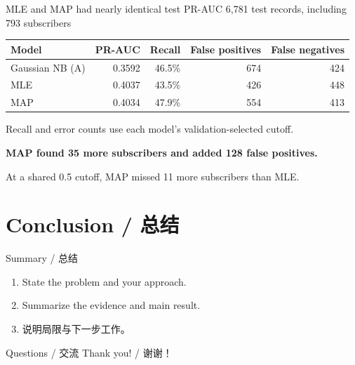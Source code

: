 \documentclass[10pt,aspectratio=169]{beamer}
\begin{document}
\begin{frame}{MLE and MAP had nearly identical test PR-AUC}
  \centering
  \small 6,781 test records, including 793 subscribers\par
  \medskip
  \normalsize
  \renewcommand{\arraystretch}{1.4}
  \begin{tabular*}{0.95\textwidth}{@{\extracolsep{\fill}}lrrrr@{}}
    \hline
    \textbf{Model} & \textbf{PR-AUC} & \textbf{Recall} &
      \textbf{False positives} & \textbf{False negatives} \\
    \hline
    Gaussian NB (A) & 0.3592 & 46.5\% & 674 & 424 \\
    MLE & 0.4037 & 43.5\% & 426 & 448 \\
    MAP & 0.4034 & 47.9\% & 554 & 413 \\
    \hline
  \end{tabular*}\par
  \smallskip
  {\footnotesize Recall and error counts use each model's validation-selected cutoff.\par}
  \bigskip
  {\color{DGBurgundy}\bfseries MAP found 35 more subscribers and added 128 false positives.\par}
  \smallskip
  {\small At a shared 0.5 cutoff, MAP missed 11 more subscribers than MLE.\par}
\end{frame}
\endgroup

\section{Conclusion / 总结}
\begin{frame}{Summary / 总结}
  \begin{enumerate}
    \item State the problem and your approach.
    \item Summarize the evidence and main result.
    \item 说明局限与下一步工作。
  \end{enumerate}
\end{frame}

\begin{frame}{Questions / 交流}
  \centering
  {\color{DGBurgundy}\Huge Thank you! / 谢谢！}
\end{frame}
\end{document}

